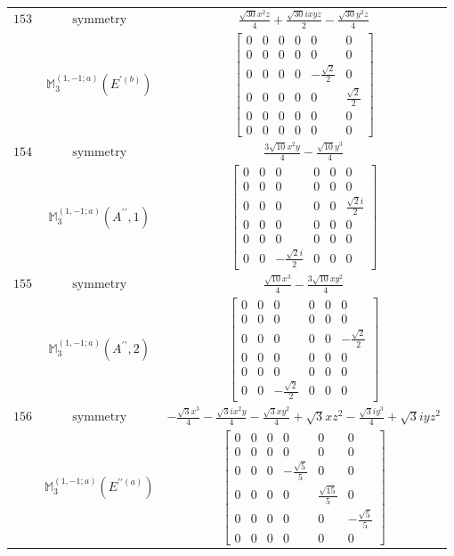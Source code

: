 \documentclass[fleqn,8pt,landscape]{jsarticle}
\begin{document}
\begin{longtable}{ccc}
$ 153 $ & $ \text{symmetry} $ & $ \frac{\sqrt{30} x^{2} z}{4} + \frac{\sqrt{30} i x y z}{2} - \frac{\sqrt{30} y^{2} z}{4} $ \\
$  $ & $ \mathbb{M}_{3}^{(1,-1;a)}(E^{\prime(b)}) $ & $ \begin{bmatrix} 0 & 0 & 0 & 0 & 0 & 0 \\ 0 & 0 & 0 & 0 & 0 & 0 \\ 0 & 0 & 0 & 0 & - \frac{\sqrt{2}}{2} & 0 \\ 0 & 0 & 0 & 0 & 0 & \frac{\sqrt{2}}{2} \\ 0 & 0 & 0 & 0 & 0 & 0 \\ 0 & 0 & 0 & 0 & 0 & 0 \end{bmatrix} $ \\ \hline
$ 154 $ & $ \text{symmetry} $ & $ \frac{3 \sqrt{10} x^{2} y}{4} - \frac{\sqrt{10} y^{3}}{4} $ \\
$  $ & $ \mathbb{M}_{3}^{(1,-1;a)}(A^{\prime\prime},1) $ & $ \begin{bmatrix} 0 & 0 & 0 & 0 & 0 & 0 \\ 0 & 0 & 0 & 0 & 0 & 0 \\ 0 & 0 & 0 & 0 & 0 & \frac{\sqrt{2} i}{2} \\ 0 & 0 & 0 & 0 & 0 & 0 \\ 0 & 0 & 0 & 0 & 0 & 0 \\ 0 & 0 & - \frac{\sqrt{2} i}{2} & 0 & 0 & 0 \end{bmatrix} $ \\ \hline
$ 155 $ & $ \text{symmetry} $ & $ \frac{\sqrt{10} x^{3}}{4} - \frac{3 \sqrt{10} x y^{2}}{4} $ \\
$  $ & $ \mathbb{M}_{3}^{(1,-1;a)}(A^{\prime\prime},2) $ & $ \begin{bmatrix} 0 & 0 & 0 & 0 & 0 & 0 \\ 0 & 0 & 0 & 0 & 0 & 0 \\ 0 & 0 & 0 & 0 & 0 & - \frac{\sqrt{2}}{2} \\ 0 & 0 & 0 & 0 & 0 & 0 \\ 0 & 0 & 0 & 0 & 0 & 0 \\ 0 & 0 & - \frac{\sqrt{2}}{2} & 0 & 0 & 0 \end{bmatrix} $ \\ \hline
$ 156 $ & $ \text{symmetry} $ & $ - \frac{\sqrt{3} x^{3}}{4} - \frac{\sqrt{3} i x^{2} y}{4} - \frac{\sqrt{3} x y^{2}}{4} + \sqrt{3} x z^{2} - \frac{\sqrt{3} i y^{3}}{4} + \sqrt{3} i y z^{2} $ \\
$  $ & $ \mathbb{M}_{3}^{(1,-1;a)}(E^{\prime\prime(a)}) $ & $ \begin{bmatrix} 0 & 0 & 0 & 0 & 0 & 0 \\ 0 & 0 & 0 & 0 & 0 & 0 \\ 0 & 0 & 0 & - \frac{\sqrt{5}}{5} & 0 & 0 \\ 0 & 0 & 0 & 0 & \frac{\sqrt{15}}{5} & 0 \\ 0 & 0 & 0 & 0 & 0 & - \frac{\sqrt{5}}{5} \\ 0 & 0 & 0 & 0 & 0 & 0 \end{bmatrix} $ \\ \hline

\end{longtable}
\end{document}
